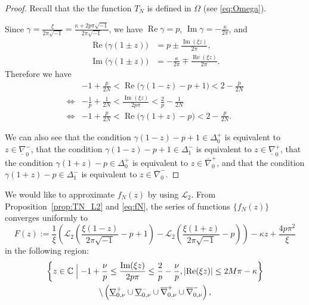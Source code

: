 \documentclass[a4paper,dvipdfmx]{amsart}
\theoremstyle{plain}
\theoremstyle{definition}
\theoremstyle{remark}
\newcommand{\C}{\mathbb{C}}
\renewcommand{\L}{\mathcal{L}}
\renewcommand{\Re}{\operatorname{Re}}
\renewcommand{\Im}{\operatorname{Im}}
\renewcommand{\i}{\sqrt{-1}}
\numberwithin{equation}{section}
\begin{document}
\begin{proof}
Recall that the the function $T_N$ is defined in $\Omega$ (see \eqref{eq:Omega}).
\par
Since $\gamma=\frac{\xi}{2\pi\i}=\frac{\kappa+2p\pi\i}{2\pi\i}$, we have $\Re\gamma=p$, $\Im\gamma=-\frac{\kappa}{2\pi}$, and
\begin{align*}
  \Re\bigl(\gamma(1\pm z)\bigr)
  &=
  p\pm\frac{\Im(\xi z)}{2\pi},
  \\
  \Im\bigl(\gamma(1\pm z)\bigr)
  &=
  -\frac{\kappa}{2\pi}\mp\frac{\Re(\xi z)}{2\pi}.
\end{align*}
Therefore we have
\begin{align*}
  &-1+\frac{p}{2N}<\Re\bigl(\gamma(1-z)-p+1\bigr)<2-\frac{p}{2N}
  \\
  \Leftrightarrow&
  -\frac{1}{p}+\frac{1}{2N}<\frac{\Im(\xi z)}{2p\pi}<\frac{2}{p}-\frac{1}{2N}
  \\
  \Leftrightarrow&
  -1+\frac{p}{2N}<\Re\bigl(\gamma(1+z)-p\bigr)<2-\frac{p}{2N}.
\end{align*}
\par
We can also see that the condition $\gamma(1-z)-p+1\in\Delta_{0}^{+}$ is equivalent to $z\in\underline{\nabla}_{0}^{-}$, that the condition $\gamma(1-z)-p+1\in\Delta_{1}^{-}$ is equivalent to $z\in\underline{\nabla}_{0}^{+}$, that the condition $\gamma(1+z)-p\in\Delta_{0}^{+}$ is equivalent to $z\in\overline{\nabla}_{0}^{+}$, and that the condition $\gamma(1+z)-p\in\Delta_{1}^{-}$ is equivalent to $z\in\overline{\nabla}_{0}^{-}$.
\end{proof}
\par
We would like to approximate $f_N(z)$ by using $\L_2$.
From Proposition~\ref{prop:TN_L2} and \eqref{eq:fN}, the series of functions $\{f_N(z)\}$ converges uniformly to
\begin{equation*}
  F(z)
  :=
  \frac{1}{\xi}
  \left(
    \L_2\left(\frac{\xi(1-z)}{2\pi\i}-p+1\right)
    -
    \L_2\left(\frac{\xi(1+z)}{2\pi\i}-p\right)
  \right)
  -\kappa z+\frac{4p\pi^2}{\xi}
\end{equation*}
in the following region:
\begin{multline}\label{eq:convergence_F}
  \left\{
    z\in\C\Bigm|
    -1+\frac{\nu}{p}\le\frac{\Im(\xi z)}{2p\pi}\le\frac{2}{p}-\frac{\nu}{p},
    \left|\Re(\xi z)\right|\le2M\pi-\kappa
  \right\}
  \\
  \setminus
  \left(
    \underline{\nabla}_{0,\nu}^{+}
    \cup
    \underline{\nabla}_{0,\nu}^{-}
    \cup
    \overline{\nabla}_{0,\nu}^{+}
    \cup
    \overline{\nabla}_{0,\nu}^{-}
  \right),
\end{multline}
\end{document}
